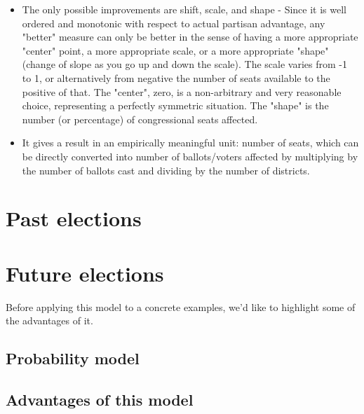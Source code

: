 \documentclass[preprint,12pt]{article}
\begin{document}
\begin{itemize}
\item The only possible improvements are shift, scale, and shape - Since it is well ordered and monotonic with respect to actual partisan advantage, any "better" measure can only be better in the sense of having a more appropriate "center" point, a more appropriate scale, or a more appropriate "shape" (change of slope as you go up and down the scale).  The scale varies from -1 to 1, or alternatively from negative the number of seats available to the positive of that.  The "center",  zero, is a non-arbitrary and very reasonable choice, representing a perfectly symmetric situation.   The "shape" is the number (or percentage) of congressional seats affected.

\item It gives a result in an empirically meaningful unit: number of seats, which can be directly converted into number of ballots/voters affected by multiplying by the number of ballots cast and dividing by the number of districts.

 
 
\end{itemize}


\section{Past elections}


\section{Future elections}


Before applying this model to a concrete examples, we'd like to highlight some of the advantages of it.


\subsection{Probability model}

\subsection{Advantages of this model}
 
\end{document}
